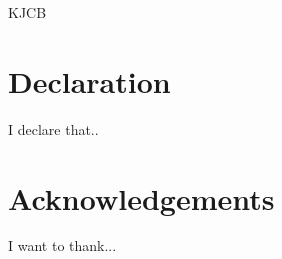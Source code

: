 \documentclass[a4paper,11pt,usegeometry]{scrreprt} %
\begin{document}
KJCB

\justifying

\chapter*{Declaration}
I declare that..

\chapter*{Acknowledgements}
I want to thank...

\tableofcontents




\listoffigures	%
\listoftables  %











\begin{scriptsize} %
\renewcommand{\bibname}{References} %
\begin{sloppypar}
\printbibliography
\end{sloppypar}

\end{scriptsize}
\end{document}
